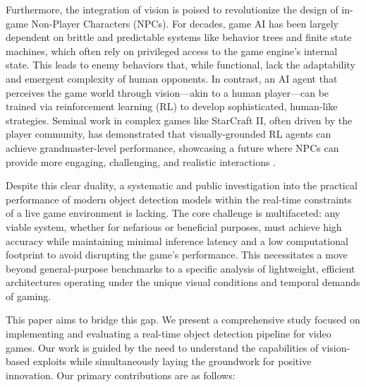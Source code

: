 \documentclass{article}
\begin{document}
Furthermore, the integration of vision is poised to revolutionize the design of in-game Non-Player Characters (NPCs). For decades, game AI has been largely dependent on brittle and predictable systems like behavior trees and finite state machines, which often rely on privileged access to the game engine's internal state. This leads to enemy behaviors that, while functional, lack the adaptability and emergent complexity of human opponents. In contrast, an AI agent that perceives the game world through vision—akin to a human player—can be trained via reinforcement learning (RL) to develop sophisticated, human-like strategies. Seminal work in complex games like StarCraft II, often driven by the player community, has demonstrated that visually-grounded RL agents can achieve grandmaster-level performance, showcasing a future where NPCs can provide more engaging, challenging, and realistic interactions \cite{vinyals2017starcraft,li2024multiagent}.

Despite this clear duality, a systematic and public investigation into the practical performance of modern object detection models within the real-time constraints of a live game environment is lacking. The core challenge is multifaceted: any viable system, whether for nefarious or beneficial purposes, must achieve high accuracy while maintaining minimal inference latency and a low computational footprint to avoid disrupting the game's performance. This necessitates a move beyond general-purpose benchmarks to a specific analysis of lightweight, efficient architectures operating under the unique visual conditions and temporal demands of gaming.

This paper aims to bridge this gap. We present a comprehensive study focused on implementing and evaluating a real-time object detection pipeline for video games. Our work is guided by the need to understand the capabilities of vision-based exploits while simultaneously laying the groundwork for positive innovation. Our primary contributions are as follows:
\end{document}

